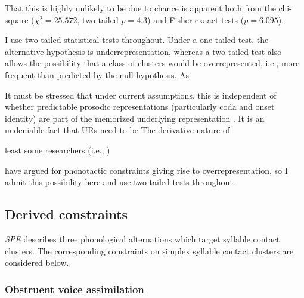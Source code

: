 That this is highly unlikely to be due to chance is apparent both from the chi-square ($\chi^2 = 25.572$, two-tailed $p = 4.3$) and Fisher exaact tests ($p =  6.095$). 

I use two-tailed statistical tests throughout. 
Under a one-tailed test, the alternative hypothesis is underrepresentation, whereas a two-tailed test also allows the possibility that a class of clusters would be overrepresented, i.e., more frequent than predicted by the null hypothesis. As 

\citet{Pierrehumbert1994}

It must be stressed that under current assumptions, this is independent of whether predictable prosodic representations (particularly coda and onset identity) are part of the memorized underlying representation \citep[e.g.,][]{Vaux2003}.
It is an undeniable fact that URs need to be 
The derivative nature of 
\citet{Ito1989a,Noske1992}

least some researchers (i.e., \citealt{Mester1988}) 

 \citep[e.g.,]{Brown2010} have argued for phonotactic constraints giving rise to overrepresentation, so I admit this possibility here and use two-tailed tests throughout. 





\subsection{Derived constraints}

\emph{SPE} describes three phonological alternations which target syllable contact clusters. The corresponding constraints on simplex syllable contact clusters are considered below.

\subsubsection{Obstruent voice assimilation}

